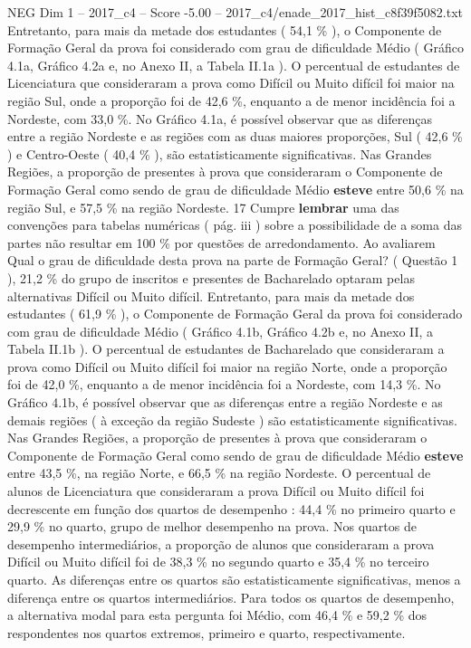 \begin{textsample}{NEG Dim 1 – 2017\_c4 – Score -5.00 – 2017\_c4/enade\_2017\_hist\_c8f39f5082.txt}
Entretanto, para mais da metade dos estudantes ( 54,1 \% ), o Componente de Formação Geral da prova foi considerado com grau de dificuldade Médio ( Gráfico 4.1a, Gráfico 4.2a e, no Anexo II, a Tabela II.1a ).
O percentual de estudantes de Licenciatura que consideraram a prova como Difícil ou Muito difícil foi maior na região Sul, onde a proporção foi de 42,6 \%, enquanto a de menor incidência foi a Nordeste, com 33,0 \%.
No Gráfico 4.1a, é possível observar que as diferenças entre a região Nordeste e as regiões com as duas maiores proporções, Sul ( 42,6 \% ) e Centro-Oeste ( 40,4 \% ), são estatisticamente significativas.
Nas Grandes Regiões, a proporção de presentes à prova que consideraram o Componente de Formação Geral como sendo de grau de dificuldade Médio \textbf{esteve} entre 50,6 \% na região Sul, e 57,5 \% na região Nordeste. 17 Cumpre \textbf{lembrar} uma das convenções para tabelas numéricas ( pág. iii ) sobre a possibilidade de a soma das partes não resultar em 100 \% por questões de arredondamento.
Ao avaliarem Qual o grau de dificuldade desta prova na parte de Formação Geral? ( Questão 1 ), 21,2 \% do grupo de inscritos e presentes de Bacharelado optaram pelas alternativas Difícil ou Muito difícil.
Entretanto, para mais da metade dos estudantes ( 61,9 \% ), o Componente de Formação Geral da prova foi considerado com grau de dificuldade Médio ( Gráfico 4.1b, Gráfico 4.2b e, no Anexo II, a Tabela II.1b ).
O percentual de estudantes de Bacharelado que consideraram a prova como Difícil ou Muito difícil foi maior na região Norte, onde a proporção foi de 42,0 \%, enquanto a de menor incidência foi a Nordeste, com 14,3 \%.
No Gráfico 4.1b, é possível observar que as diferenças entre a região Nordeste e as demais regiões ( à exceção da região Sudeste ) são estatisticamente significativas.
Nas Grandes Regiões, a proporção de presentes à prova que consideraram o Componente de Formação Geral como sendo de grau de dificuldade Médio \textbf{esteve} entre 43,5 \%, na região Norte, e 66,5 \% na região Nordeste.
O percentual de alunos de Licenciatura que consideraram a prova Difícil ou Muito difícil foi decrescente em função dos quartos de desempenho : 44,4 \% no primeiro quarto e 29,9 \% no quarto, grupo de melhor desempenho na prova.
Nos quartos de desempenho intermediários, a proporção de alunos que consideraram a prova Difícil ou Muito difícil foi de 38,3 \% no segundo quarto e 35,4 \% no terceiro quarto.
As diferenças entre os quartos são estatisticamente significativas, menos a diferença entre os quartos intermediários.
Para todos os quartos de desempenho, a alternativa modal para esta pergunta foi Médio, com 46,4 \% e 59,2 \% dos respondentes nos quartos extremos, primeiro e quarto, respectivamente.

\end{textsample}
